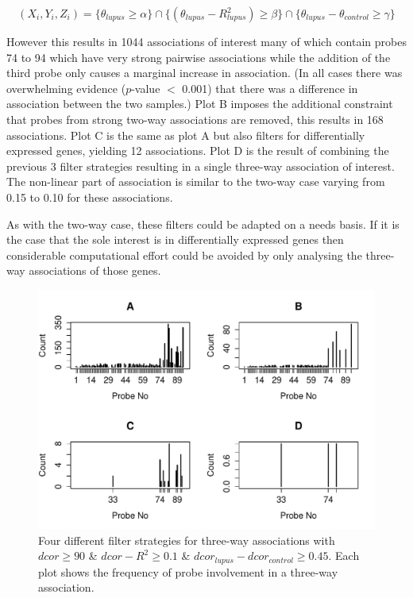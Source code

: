 \documentclass[a4paper, 12pt]{report}
\begin{document}
\[
(X_i, Y_i, Z_i) = \{\theta_{lupus} \ge \alpha \} \cap \{ (\theta_{lupus} - R^2_{lupus}) \ge \beta \} \cap \{ \theta_{lupus} - \theta_{control} \ge \gamma \}
\]

However this results in 1044 associations of interest many of which contain probes 74 to 94 which have very strong pairwise associations while the addition of the third probe only causes a marginal increase in association. (In all cases there was overwhelming evidence ($p$-value $<$ 0.001) that there was a difference in association between the two samples.) Plot B imposes the additional constraint that probes from strong two-way associations are removed, this results in 168 associations. Plot C is the same as plot A but also filters for differentially expressed genes, yielding 12 associations. Plot D is the result of combining the previous 3 filter strategies resulting in a single three-way association of interest. The non-linear part of association is similar to the two-way case varying from 0.15 to 0.10 for these associations. 

As with the two-way case, these filters could be adapted on a needs basis. If it is the case that the sole interest is in differentially expressed genes then considerable computational effort could be avoided by only analysing the three-way associations of those genes.


\begin{figure}[H]
\begin{centering}
\includegraphics[width=15cmh]{3wayFilter.pdf}
\caption{Four different filter strategies for three-way associations with $dcor \ge 90$ \& $dcor - R^2 \ge 0.1$ \& $dcor_{lupus} - dcor_{control} \ge 0.45$. Each plot shows the frequency of probe involvement in a three-way association.} 
\label{F:3wayFilter}
\end{centering}
\end{figure}
\end{document}
